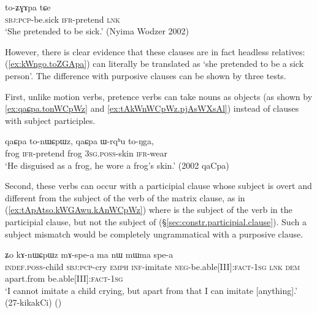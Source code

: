 \begin{exe}
\ex \label{ex:kWngo.toZGApa}
\gll  [kɯ-ngo] to-ʑɣɤpa tɕe \\
\textsc{sbj}:\textsc{pcp}-be.sick \textsc{ifr}-pretend \textsc{lnk} \\
\glt `She pretended to be sick.' (Nyima Wodzer 2002)
 \end{exe}

However, there is clear evidence that these clauses are in fact headless relatives: (\ref{ex:kWngo.toZGApa}) can literally be translated as `she pretended to be a sick person'. The difference with purposive clauses can be shown by three tests. 

First, unlike motion verbs, pretence verbs can take nouns as objects (as shown by \ref{ex:qaɕpa.tonWCpWz} and \ref{ex:tAkWnWCpWz.pjAsWXsAl}) instead of clauses with subject participles.  

\begin{exe}
\ex \label{ex:qaɕpa.tonWCpWz}
 \gll  qaɕpa to-nɯɕpɯz, qaɕpa ɯ-rqʰu to-ŋga, \\
frog \textsc{ifr}-pretend frog \textsc{3sg}.\textsc{poss}-skin \textsc{ifr}-wear \\
\glt `He disguised as a frog, he wore a frog's skin.' (2002 qaCpa)
\end{exe}
 
 Second, these verbs can occur with a participial clause whose subject is overt and different from the subject of the verb of the matrix clause, as in (\ref{ex:tApAtso.kWGAwu.kAnWCpWz}) where   is the subject of the verb  in the participial clause, but not the subject of   (§\ref{sec:constr.participial.clause}). Such a subject mismatch would be completely ungrammatical with a purposive clause.
 
\begin{exe}
\ex \label{ex:tApAtso.kWGAwu.kAnWCpWz}
  ʑo kɤ-nɯɕpɯz mɤ-spe-a ma nɯ mɯma spe-a \\
 \textsc{indef}.\textsc{poss}-child \textsc{sbj}:\textsc{pcp}-cry \textsc{emph} \textsc{inf}-imitate \textsc{neg}-be.able[III]:\textsc{fact}-\textsc{1sg} \textsc{lnk} \textsc{dem} apart.from be.able[III]:\textsc{fact}-\textsc{1sg} \\
\glt `I cannot imitate a child crying, but apart from that I can imitate [anything].' (27-kikakCi)
()
\end{exe}

